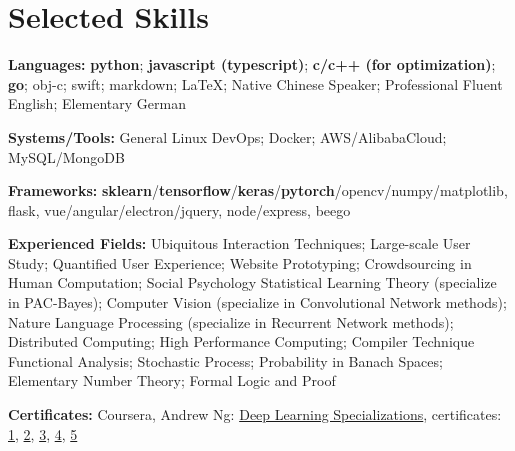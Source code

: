 \section{\textbf{Selected Skills}}
\resumeSubHeadingListStart
\item{
  \textbf{Languages:}{ \textbf{python}; \textbf{javascript (typescript)}; \textbf{c/c++ (for optimization)}; \textbf{go}; obj-c; swift; markdown; \LaTeX; Native Chinese Speaker; Professional Fluent English; Elementary German}
}
\item{
 \textbf{Systems/Tools:}{ General Linux DevOps; Docker; AWS/AlibabaCloud; MySQL/MongoDB}
}
\item{
 \textbf{Frameworks:}{ \textbf{sklearn}/\textbf{tensorflow}/\textbf{keras}/\textbf{pytorch}/opencv/numpy/matplotlib, flask, vue/angular/electron/jquery, node/express, beego}
}
\item{
  \textbf{Experienced Fields:}{ 
    \resumeItemListStart
       { Ubiquitous Interaction Techniques; Large-scale User Study; Quantified User Experience; Website Prototyping; Crowdsourcing in Human Computation; Social Psychology}
       { Statistical Learning Theory (specialize in PAC-Bayes); Computer Vision (specialize in Convolutional Network methods); Nature Language Processing (specialize in Recurrent Network methods); Distributed Computing; High Performance Computing; Compiler Technique}
       { Functional Analysis; Stochastic Process; Probability in Banach Spaces; Elementary Number Theory; Formal Logic and Proof}
   \resumeItemListEnd
  }
}
\item{
 \textbf{Certificates:}{
  Coursera, Andrew Ng: \href{https://www.coursera.org/account/accomplishments/specialization/QGH8ZVJ6J2L2}{Deep Learning Specializations}, certificates:
  \href{https://www.coursera.org/account/accomplishments/verify/YH4NT7HHN263}{1}, 
  \href{https://www.coursera.org/account/accomplishments/verify/QGH3GNGF6BM4}{2}, 
  \href{https://www.coursera.org/account/accomplishments/verify/6VU45R2SZEF6}{3},
  \href{https://www.coursera.org/account/accomplishments/verify/LF3K9BQQDLVL}{4},
  \href{https://www.coursera.org/account/accomplishments/verify/JQFLW2DPYAGW}{5}
 }
}
\resumeSubHeadingListEnd
